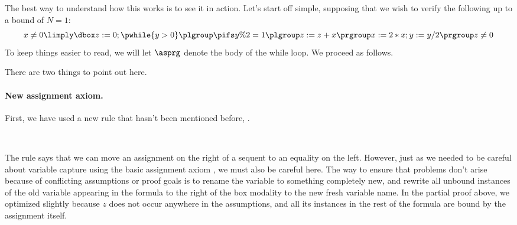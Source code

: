 \documentclass[11pt,twoside]{scrartcl}
\begin{document}
The best way to understand how this works is to see it in action. Let's start off simple, supposing that we wish to verify the following up to a bound of $N=1$:
\[
x \ne 0 \limply \dbox{z:=0; \pwhile{y>0}{\plgroup \pifs{y\%2=1}{\plgroup z:=z+x \prgroup} x:=2*x; y:=y/2\prgroup}}{z \ne 0}
\]
To keep things easier to read, we will let $\asprg$ denote the body of the while loop. We proceed as follows.
\begin{sequentdeduction}[array]
 {
}
\end{sequentdeduction}
There are two things to point out here. 

\paragraph{New assignment axiom.}
First, we have used a new rule that hasn't been mentioned before, .
\begin{center}
\begin{calculus}
  {
    {\lsequent[L]{} {}}
   ~~
  }
  {}
\end{calculus} 
\end{center}
The  rule says that we can move an assignment on the right of a sequent to an equality on the left. However, just as we needed to be careful about variable capture using the basic assignment axiom , we must also be careful here. The way to ensure that problems don't arise because of conflicting assumptions or proof goals is to rename the variable to something completely new, and rewrite all unbound instances of the old variable appearing in the formula to the right of the box modality to the new fresh variable name. In the partial proof above, we optimized slightly because $z$ does not occur anywhere in the assumptions, and all its instances in the rest of the formula are bound by the assignment itself.
\end{document}
